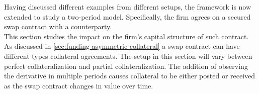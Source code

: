 \documentclass[main.tex]{subfiles}
\begin{document}
    Having discussed different examples from different setups,
    the framework is now extended to study a two-period model.
    Specifically, the firm agrees on a secured swap contract with a counterparty.
    \\
    This section studies the impact on the firm's capital structure of such contract.
    As discussed in \cref{sec:funding-asymmetric-collateral} a swap contract can have different types collateral agreements. The setup in this section will vary between perfect collateralization and partial collateralization. The addition of observing the derivative in multiple periods causes collateral to be either posted or received as the swap contract changes in value over time.
\end{document}
